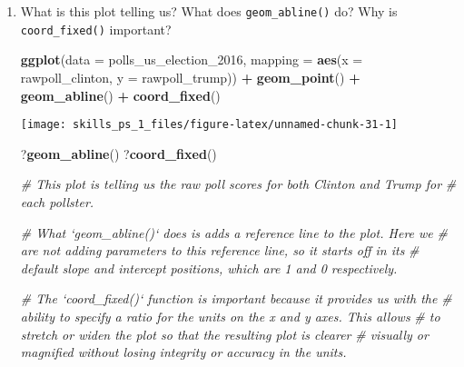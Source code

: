 \documentclass[
]{article}
\newenvironment{Shaded}{\begin{snugshade}}{\end{snugshade}}
\newcommand{\CommentTok}[1]{\textcolor[rgb]{0.56,0.35,0.01}{\textit{#1}}}
\newcommand{\DataTypeTok}[1]{\textcolor[rgb]{0.13,0.29,0.53}{#1}}
\newcommand{\DecValTok}[1]{\textcolor[rgb]{0.00,0.00,0.81}{#1}}
\newcommand{\KeywordTok}[1]{\textcolor[rgb]{0.13,0.29,0.53}{\textbf{#1}}}
\newcommand{\NormalTok}[1]{#1}
\newcommand{\OperatorTok}[1]{\textcolor[rgb]{0.81,0.36,0.00}{\textbf{#1}}}
\newcommand{\StringTok}[1]{\textcolor[rgb]{0.31,0.60,0.02}{#1}}
\begin{document}
\begin{enumerate}
\def\labelenumi{\arabic{enumi}.}
\item
  What is this plot telling us? What does \texttt{geom\_abline()} do?
  Why is \texttt{coord\_fixed()} important?

\begin{Shaded}
\begin{Highlighting}[]
\KeywordTok{ggplot}\NormalTok{(}\DataTypeTok{data =}\NormalTok{ polls_us_election_}\DecValTok{2016}\NormalTok{, }
       \DataTypeTok{mapping =} \KeywordTok{aes}\NormalTok{(}\DataTypeTok{x =}\NormalTok{ rawpoll_clinton, }
                     \DataTypeTok{y =}\NormalTok{ rawpoll_trump)) }\OperatorTok{+}
\StringTok{  }\KeywordTok{geom_point}\NormalTok{() }\OperatorTok{+}\StringTok{ }
\StringTok{  }\KeywordTok{geom_abline}\NormalTok{() }\OperatorTok{+}
\StringTok{  }\KeywordTok{coord_fixed}\NormalTok{()}
\end{Highlighting}
\end{Shaded}

  \texttt{[image: skills\_ps\_1\_files/figure-latex/unnamed-chunk-31-1]}

\begin{Shaded}
\begin{Highlighting}[]
\NormalTok{?}\KeywordTok{geom_abline}\NormalTok{()}
\NormalTok{?}\KeywordTok{coord_fixed}\NormalTok{()}

\CommentTok{# This plot is telling us the raw poll scores for both Clinton and Trump for}
\CommentTok{# each pollster.}

\CommentTok{# What `geom_abline()` does is adds a reference line to the plot. Here we}
\CommentTok{# are not adding parameters to this reference line, so it starts off in its}
\CommentTok{# default slope and intercept positions, which are 1 and 0 respectively. }

\CommentTok{# The `coord_fixed()` function is important because it provides us with the}
\CommentTok{# ability to specify a ratio for the units on the x and y axes. This allows}
\CommentTok{# to stretch or widen the plot so that the resulting plot is clearer }
\CommentTok{# visually or magnified without losing integrity or accuracy in the units.}
\end{Highlighting}
\end{Shaded}
\end{enumerate}
\end{document}
